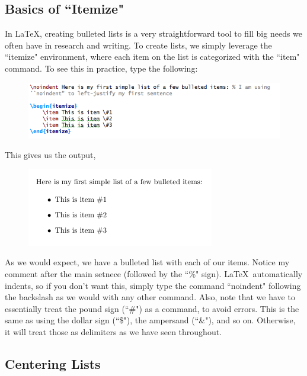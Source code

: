 \documentclass[11pt]{article}
\newcommand{\forceindent}{\leavevmode{\parindent=1.5em\indent}} %
\begin{document}
\subsection{Basics of ``Itemize"}

\forceindent In \LaTeX, creating bulleted lists is a very straightforward tool to fill big needs we often have in research and writing. To create lists, we simply leverage the ``itemize" environment, where each item on the list is categorized with the ``item" command. To see this in practice, type the following:

\begin{figure}[!h]
	\includegraphics[scale=.6]{CODE8} \\
	\centering
\end{figure}

This gives us the output, \\

\begin{figure}[!h]
	\includegraphics[scale=.6]{OUT8} \\
	\centering
\end{figure}

As we would expect, we have a bulleted list with each of our items. Notice my comment after the main setnece (followed by the ``\%" sign). \LaTeX\ automatically indents, so if you don't want this, simply type the command ``noindent" following the backslash as we would with any other command. Also, note that we have to essentially treat the pound sign (``\#") as a command, to avoid errors. This is the same as using the dollar sign (``\$"), the ampersand (``\&"), and so on. Otherwise, it will treat those as delimiters as we have seen throughout. \\

\subsection{Centering Lists}
\end{document}
